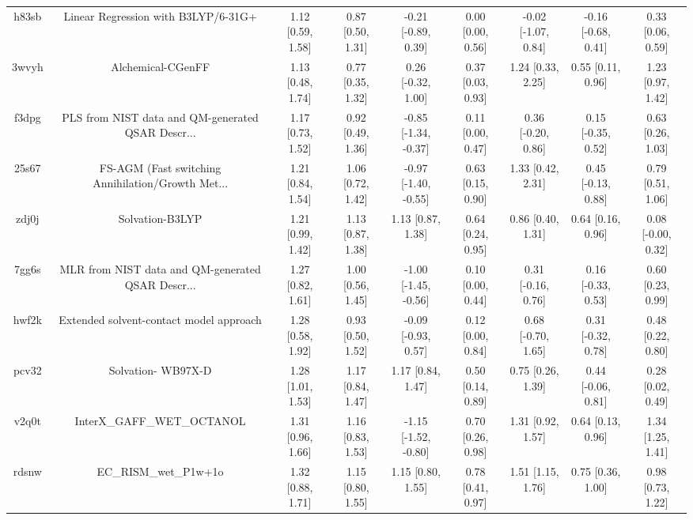 \documentclass{article}
\begin{document}
\begin{center}
\begin{longtable}{|ccccccccc|}
 h83sb &                Linear Regression with B3LYP/6-31G+ &  1.12 [0.59, 1.58] &  0.87 [0.50, 1.31] &   -0.21 [-0.89, 0.39] &  0.00 [0.00, 0.56] &  -0.02 [-1.07, 0.84] &  -0.16 [-0.68, 0.41] &     0.33 [0.06, 0.59] \\
 3wvyh &                                  Alchemical-CGenFF &  1.13 [0.48, 1.74] &  0.77 [0.35, 1.32] &    0.26 [-0.32, 1.00] &  0.37 [0.03, 0.93] &    1.24 [0.33, 2.25] &    0.55 [0.11, 0.96] &     1.23 [0.97, 1.42] \\
 f3dpg &  PLS from NIST data and QM-generated QSAR Descr... &  1.17 [0.73, 1.52] &  0.92 [0.49, 1.36] &  -0.85 [-1.34, -0.37] &  0.11 [0.00, 0.47] &   0.36 [-0.20, 0.86] &   0.15 [-0.35, 0.52] &     0.63 [0.26, 1.03] \\
 25s67 &  FS-AGM (Fast switching Annihilation/Growth Met... &  1.21 [0.84, 1.54] &  1.06 [0.72, 1.42] &  -0.97 [-1.40, -0.55] &  0.63 [0.15, 0.90] &    1.33 [0.42, 2.31] &   0.45 [-0.13, 0.88] &     0.79 [0.51, 1.06] \\
 zdj0j &                                    Solvation-B3LYP &  1.21 [0.99, 1.42] &  1.13 [0.87, 1.38] &     1.13 [0.87, 1.38] &  0.64 [0.24, 0.95] &    0.86 [0.40, 1.31] &    0.64 [0.16, 0.96] &    0.08 [-0.00, 0.32] \\
 7gg6s &  MLR from NIST data and QM-generated QSAR Descr... &  1.27 [0.82, 1.61] &  1.00 [0.56, 1.45] &  -1.00 [-1.45, -0.56] &  0.10 [0.00, 0.44] &   0.31 [-0.16, 0.76] &   0.16 [-0.33, 0.53] &     0.60 [0.23, 0.99] \\
 hwf2k &            Extended solvent-contact model approach &  1.28 [0.58, 1.92] &  0.93 [0.50, 1.52] &   -0.09 [-0.93, 0.57] &  0.12 [0.00, 0.84] &   0.68 [-0.70, 1.65] &   0.31 [-0.32, 0.78] &     0.48 [0.22, 0.80] \\
 pcv32 &                                 Solvation- WB97X-D &  1.28 [1.01, 1.53] &  1.17 [0.84, 1.47] &     1.17 [0.84, 1.47] &  0.50 [0.14, 0.89] &    0.75 [0.26, 1.39] &   0.44 [-0.06, 0.81] &     0.28 [0.02, 0.49] \\
 v2q0t &                         InterX\_GAFF\_WET\_OCTANOL &  1.31 [0.96, 1.66] &  1.16 [0.83, 1.53] &  -1.15 [-1.52, -0.80] &  0.70 [0.26, 0.98] &    1.31 [0.92, 1.57] &    0.64 [0.13, 0.96] &     1.34 [1.25, 1.41] \\
 rdsnw &                              EC\_RISM\_wet\_P1w+1o &  1.32 [0.88, 1.71] &  1.15 [0.80, 1.55] &     1.15 [0.80, 1.55] &  0.78 [0.41, 0.97] &    1.51 [1.15, 1.76] &    0.75 [0.36, 1.00] &     0.98 [0.73, 1.22] \\

\end{longtable}
\end{center}
\end{document}
